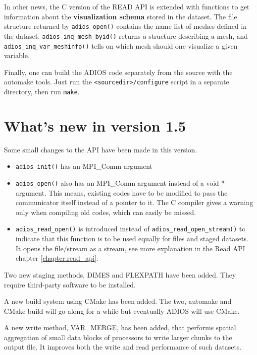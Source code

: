 \noindent In other news, the C version of the READ API is extended with functions to get information about the {\bf visualization schema} stored in the dataset. The file structure returned by \verb+adios_open()+ contains the name list of meshes defined in the dataset. \verb+adios_inq_mesh_byid()+ returns a structure describing a mesh, and \verb+adios_inq_var_meshinfo()+ tells on which mesh should one visualize a given variable.

\vspace{10pt}

\noindent Finally, one can build the ADIOS code separately from the source with the automake tools. Just run the \verb+<sourcedir>/configure+ script in a separate directory, then run \verb+make+.

%
%
\section {What's new in version 1.5}

Some small changes to the API have been made in this version.
\begin{itemize}
\item \verb+adios_init()+ has an MPI\_Comm argument
\item \verb+adios_open()+ also has an MPI\_Comm argument instead of a void * argument. This means, existing codes have to be modified to pass the communicator itself instead of a pointer to it. The C compiler gives a warning only when compiling old codes, which can easily be missed.
\item \verb+adios_read_open()+ is introduced instead of \verb+adios_read_open_stream()+ to indicate that this function is to be used equally for files and staged datasets. It opens the file/stream as a stream, see more explanation in the Read API chapter \ref{chapter:read_api}.
\end{itemize}

Two new staging methods, DIMES and FLEXPATH have been added. They require third-party software to be installed.

A new build system using CMake has been added. The two, automake and CMake build will go along for a while but eventually ADIOS will use CMake.

A new write method, VAR\_MERGE, has been added, that performs spatial aggregation of small data blocks of processors to write larger chunks to the output file. It improves both the write and read performance of such datasets.

